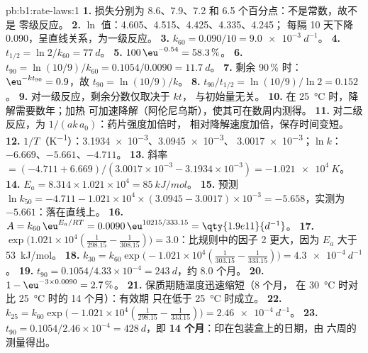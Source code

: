 \begin{solution}{pb:b1:rate-laws:1}
\textbf{1.} 损失分别为 8.6、7.9、7.2 和 6.5 个百分点：不是常数，故不是
零级反应。
\textbf{2.} $\ln$ 值：4.605、4.515、4.425、4.335、4.245；
每隔 10 天下降 0.090，呈直线关系，为一级反应。
\textbf{3.} $k_{60} = 0.090/10 = \qty{9.0e-3}{d^{-1}}$。
\textbf{4.} $t_{1/2} = \ln2/k_{60} = \qty{77}{d}$。
\textbf{5.} $100\,\eu^{-0.54} = 58.3\,\%$。
\textbf{6.} $t_{90} = \ln(10/9)/k_{60} = 0.1054/0.0090 = \qty{11.7}{d}$。
\textbf{7.} 剩余 90\,\% 时：$\eu^{-kt_{90}} = 0.9$，故 $t_{90} = \ln(10/9)/k$。
\textbf{8.} $t_{90}/t_{1/2} = \ln(10/9)/\ln2 = 0.152$。
\textbf{9.} 对一级反应，剩余分数仅取决于 $kt$，
与初始量无关。
\textbf{10.} 在 \qty{25}{\celsius} 时，降解需要数年；加热
可加速降解（阿伦尼乌斯），使其可在数周内测得。
\textbf{11.} 对二级反应，为 $1/(ak\,a_0)$：药片强度加倍时，
相对降解速度加倍，保存时间变短。
\textbf{12.} $1/T$（\unit{K^{-1}}）：\num{3.1934e-3}、\num{3.0945e-3}、
\num{3.0017e-3}；$\ln k$：$-6.669$、$-5.661$、$-4.711$。
\textbf{13.} 斜率 $= (-4.711 + 6.669)/(3.0017 \times 10^{-3} - 3.1934 \times
10^{-3}) = \qty{-1.021e4}{K}$。
\textbf{14.} $E_a = 8.314 \times 1.021 \times 10^4 = \qty{85}{kJ/mol}$。
\textbf{15.} 预测 $\ln k_{50} = -4.711 - 1.021 \times 10^4 \times (3.0945 -
3.0017) \times 10^{-3} = -5.658$，实测为 $-5.661$：落在直线上。
\textbf{16.} $A = k_{60}\,\eu^{E_a/RT} = 0.0090\,\eu^{10215/333.15} =
\qty{1.9e11}{d^{-1}}$。
\textbf{17.} $\exp\big(1.021 \times 10^4(\frac{1}{298.15} -
\frac{1}{308.15})\big) = 3.0$：比规则中的因子 2 更大，因为
$E_a$ 大于 \qty{53}{kJ/mol}。
\textbf{18.} $k_{30} = k_{60}\exp\big(-1.021 \times 10^4(\frac{1}{303.15} -
\frac{1}{333.15})\big) = \qty{4.3e-4}{d^{-1}}$。
\textbf{19.} $t_{90} = 0.1054/4.33 \times 10^{-4} = \qty{243}{d}$，约 8.0
个月。
\textbf{20.} $1 - \eu^{-3 \times 0.0090} = 2.7\,\%$。
\textbf{21.} 保质期随温度迅速缩短（8 个月，
在 \qty{30}{\celsius} 时对比 \qty{25}{\celsius} 时的 14 个月）：有效期
只在低于 \qty{25}{\celsius} 时成立。
\textbf{22.} $k_{25} = k_{60}\exp\big(-1.021 \times 10^4(\frac{1}{298.15} -
\frac{1}{333.15})\big) = \qty{2.46e-4}{d^{-1}}$。
\textbf{23.} $t_{90} = 0.1054/2.46 \times 10^{-4} = \qty{428}{d}$，即
\textbf{14 个月}：印在包装盒上的日期，由
六周的测量得出。
\end{solution}
